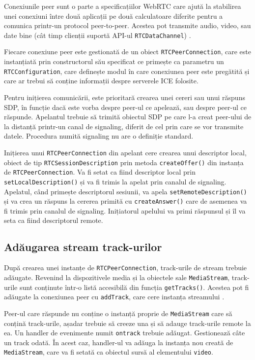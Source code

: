 \indent \par Conexiunile peer sunt o parte a specificațiilor WebRTC care ajută la stabilirea unei conexiuni între două aplicații pe două calculatoare diferite pentru a comunica printr-un protocol peer-to-peer. Acestea pot transmite audio, video, sau date bine (cât timp clienții suportă API-ul \texttt{RTCDataChannel}) \cite{WebPeer2014}.
\indent \par Fiecare conexiune peer este gestionată de un obiect \texttt{RTCPeerConnection}, care este instanțiată prin constructorul său specificat ce primește ca parametru un \texttt{RTCConfiguration}, care definește modul în care conexiunea peer este pregătită și care ar trebui să conține informații despre serverele ICE folosite.
\indent \par Pentru inițierea comunicării, este prioritară crearea unei cereri sau unui răspuns SDP, în funcție dacă este vorba despre peer-ul ce apelează, sau despre peer-ul ce răspunde. Apelantul trebuie să trimită obiectul SDP pe care l-a creat peer-ului de la distanță printr-un canal de signaling, diferit de cel prin care se vor transmite datele. Procedura numită signaling nu are o definiție standard.
\indent \par Inițierea unui \texttt{RTCPeerConnection} din apelant cere crearea unui descriptor local, obiect de tip \texttt{RTCSessionDescription} prin metoda \texttt{createOffer()} din instanța de \texttt{RTCPeerConnection}. Va fi setat ca fiind descriptor local prin \texttt{setLocalDescription()} și va fi trimis la apelat prin canalul de signaling. Apelatul, când primește descriptorul sesiunii, va apela \texttt{setRemoteDescription()} și va crea un răspuns la cererea primită cu \texttt{createAnswer()} care de asemenea va fi trimis prin canalul de signaling. Inițiatorul apelului va primi răspunsul și îl va seta ca fiind descriptorul remote.

\subsection{Adăugarea stream track-urilor}
\label{sec:ch3sec4subsec3}

\indent \par După crearea unei instanțe de \texttt{RTCPeerConnection}, track-urile de stream trebuie adăugate. Revenind la dispozitivele media și la obiectele sale \texttt{MediaStream}, track-urile sunt conținute într-o listă accesibilă din funcția \texttt{getTracks()}. Acestea pot fi adăugate la conexiunea peer cu \texttt{addTrack}, care cere instanța streamului \cite{WebStream2014}.
\indent \par Peer-ul care răspunde nu conține o instanță proprie de \texttt{MediaStream} care să conțină track-urile, așadar trebuie să creeze una și să adauge track-urile remote la ea. Un handler de evenimente numit \texttt{ontrack} trebuie adăugat. Gestionează câte un track odată. În acest caz, handler-ul va adăuga la instanța nou creată de \texttt{MediaStream}, care va fi setată ca obiectul sursă al elementului \texttt{video}.


